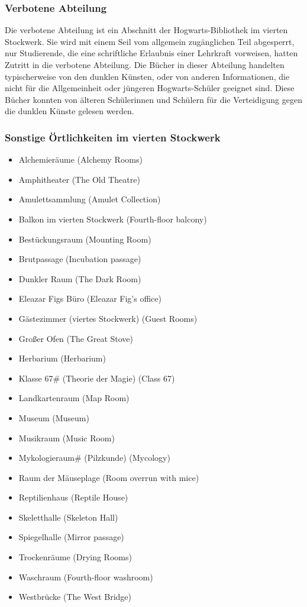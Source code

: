 \documentclass[a4paper, 10pt]{article}
\begin{document}
\subsubsection*{\large Verbotene Abteilung}
Die verbotene Abteilung ist ein Abschnitt der Hogwarts-Bibliothek im vierten Stockwerk. Sie wird mit einem Seil vom allgemein zugänglichen Teil abgesperrt, nur Studierende, die eine schriftliche Erlaubnis einer Lehrkraft vorweisen, hatten Zutritt in die verbotene Abteilung. Die Bücher in dieser Abteilung handelten typischerweise von den dunklen Künsten, oder von anderen Informationen, die nicht für die Allgemeinheit oder jüngeren Hogwarts-Schüler geeignet sind. Diese Bücher konnten von älteren Schülerinnen und Schülern für die Verteidigung gegen die dunklen Künste gelesen werden.
\subsubsection*{\large Sonstige Örtlichkeiten im vierten Stockwerk}
\vspace{10pt}
\begin{itemize}
    \item Alchemieräume (Alchemy Rooms)
    \item Amphitheater (The Old Theatre)
    \item Amulettsammlung (Amulet Collection)
    \item Balkon im vierten Stockwerk (Fourth-floor balcony)
    \item Bestückungsraum (Mounting Room)
    \item Brutpassage (Incubation passage)
    \item Dunkler Raum (The Dark Room)
    \item Eleazar Figs Büro (Eleazar Fig's office)
    \item Gästezimmer (viertes Stockwerk) (Guest Rooms)
    \item Großer Ofen (The Great Stove)
    \item Herbarium (Herbarium)
    \item Klasse 67# (Theorie der Magie) (Class 67)
    \item Landkartenraum (Map Room)
    \item Museum (Museum)
    \item Musikraum (Music Room)
    \item Mykologieraum# (Pilzkunde) (Mycology)
    \item Raum der Mäuseplage (Room overrun with mice)
    \item Reptilienhaus (Reptile House)
    \item Skeletthalle (Skeleton Hall)
    \item Spiegelhalle (Mirror passage)
    \item Trockenräume (Drying Rooms)
    \item Waschraum (Fourth-floor washroom)
    \item Westbrücke (The West Bridge)
\end{itemize}
\end{document}
